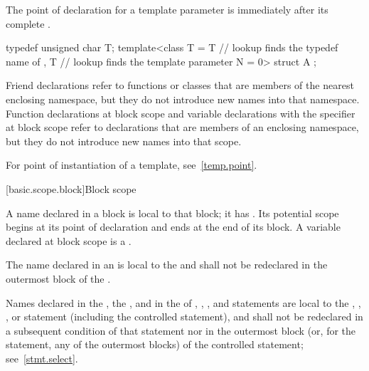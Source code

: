 \pnum
The point of declaration for a template parameter is immediately after its complete
. \begin{example}

\begin{codeblock}
typedef unsigned char T;
template<class T
  = T     // lookup finds the typedef name of 
  , T     // lookup finds the template parameter
    N = 0> struct A { };
\end{codeblock}
\end{example}

\pnum
\begin{note} Friend declarations refer to functions or classes that are
members of the nearest enclosing namespace, but they do not introduce
new names into that namespace. Function
declarations at block scope and variable declarations with the
 specifier at block scope refer to declarations that are
members of an enclosing namespace, but they do not introduce new names
into that scope.
\end{note}

\pnum
\begin{note} For point of instantiation of a template,
see~\ref{temp.point}.\end{note}%

[basic.scope.block]{Block scope}

\pnum
{}%
%
A name declared in a block is local to that block; it has
.
Its potential scope begins at its point of
declaration and ends at the end of its block.
A variable declared at block scope is a .

\pnum
{}%
The name declared in an 
is local to the
 and shall not be redeclared in the outermost block of the
.

\pnum
Names declared in the , the , and in the
 of , , , and
 statements are local to the , ,
, or  statement (including the controlled
statement), and shall not be redeclared in a subsequent condition of
that statement nor in the outermost block (or, for the 
statement, any of the outermost blocks) of the controlled statement;
see~\ref{stmt.select}.

